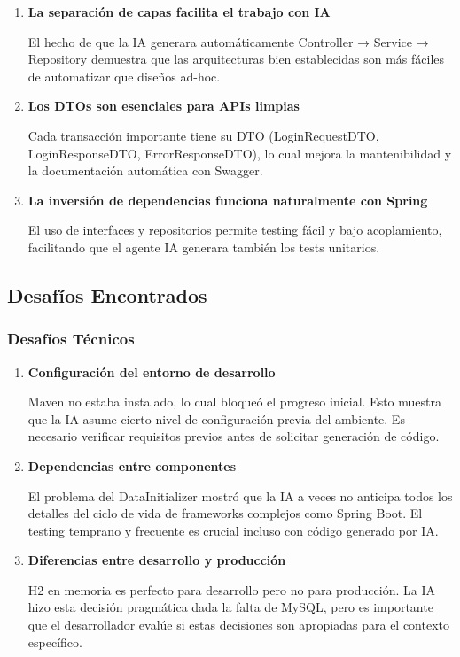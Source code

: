 \documentclass[11pt,a4paper]{article}
\begin{document}
\begin{enumerate}
    \item \textbf{La separación de capas facilita el trabajo con IA}
    
    El hecho de que la IA generara automáticamente Controller → Service → Repository demuestra que las arquitecturas bien establecidas son más fáciles de automatizar que diseños ad-hoc.
    
    \item \textbf{Los DTOs son esenciales para APIs limpias}
    
    Cada transacción importante tiene su DTO (LoginRequestDTO, LoginResponseDTO, ErrorResponseDTO), lo cual mejora la mantenibilidad y la documentación automática con Swagger.
    
    \item \textbf{La inversión de dependencias funciona naturalmente con Spring}
    
    El uso de interfaces y repositorios permite testing fácil y bajo acoplamiento, facilitando que el agente IA generara también los tests unitarios.
\end{enumerate}

\subsection{Desafíos Encontrados}

\subsubsection{Desafíos Técnicos}

\begin{enumerate}
    \item \textbf{Configuración del entorno de desarrollo}
    
    Maven no estaba instalado, lo cual bloqueó el progreso inicial. Esto muestra que la IA asume cierto nivel de configuración previa del ambiente. Es necesario verificar requisitos previos antes de solicitar generación de código.
    
    \item \textbf{Dependencias entre componentes}
    
    El problema del DataInitializer mostró que la IA a veces no anticipa todos los detalles del ciclo de vida de frameworks complejos como Spring Boot. El testing temprano y frecuente es crucial incluso con código generado por IA.
    
    \item \textbf{Diferencias entre desarrollo y producción}
    
    H2 en memoria es perfecto para desarrollo pero no para producción. La IA hizo esta decisión pragmática dada la falta de MySQL, pero es importante que el desarrollador evalúe si estas decisiones son apropiadas para el contexto específico.
\end{enumerate}
\end{document}
